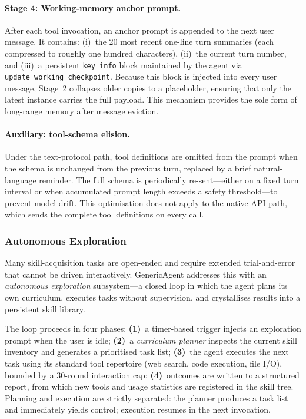 \paragraph{Stage 4: Working-memory anchor prompt.}
After each tool invocation, an anchor prompt is appended to the next
user message.  It contains: (i)~the 20 most recent one-line turn
summaries (each compressed to roughly one hundred characters),
(ii)~the current turn number, and (iii)~a persistent \texttt{key\_info}
block maintained by the agent via
\texttt{update\_working\_checkpoint}.  Because this block is injected
into every user message, Stage~2 collapses older copies to a
placeholder, ensuring that only the latest instance carries the full
payload.  This mechanism provides the sole form of long-range memory
after message eviction.

\paragraph{Auxiliary: tool-schema elision.}
Under the text-protocol path, tool definitions are omitted from the
prompt when the schema is unchanged from the previous turn, replaced
by a brief natural-language reminder.  The full schema is periodically
re-sent---either on a fixed turn interval or when accumulated prompt
length exceeds a safety threshold---to prevent model drift.  This
optimisation does not apply to the native API path, which sends the
complete tool definitions on every call.

\subsubsection{Autonomous Exploration}
\label{sec:autonomous-exploration}

Many skill-acquisition tasks are open-ended and require extended
trial-and-error that cannot be driven interactively.  GenericAgent
addresses this with an \emph{autonomous exploration} subsystem---a
closed loop in which the agent plans its own curriculum, executes
tasks without supervision, and crystallises results into a persistent
skill library.

The loop proceeds in four phases:
\textbf{(1)}~a timer-based trigger injects an exploration prompt when
the user is idle;
\textbf{(2)}~a \emph{curriculum planner} inspects the current skill
inventory and generates a prioritised task list;
\textbf{(3)}~the agent executes the next task using its standard tool
repertoire (web search, code execution, file I/O), bounded by a
30-round interaction cap;
\textbf{(4)}~outcomes are written to a structured report, from which
new tools and usage statistics are registered in the skill tree.
Planning and execution are strictly separated: the planner produces a
task list and immediately yields control; execution resumes in the
next invocation.

